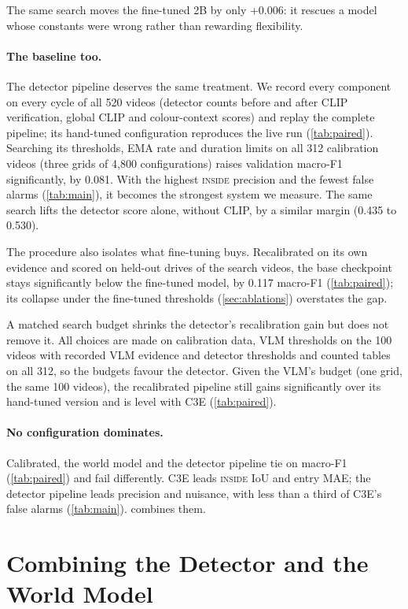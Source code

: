 \documentclass[conference]{IEEEtran}
\let\oldtextsc\textsc
\renewcommand{\textsc}[1]{\mbox{\oldtextsc{#1}}}
\begin{document}
The same search moves the fine-tuned 2B by only +0.006: it rescues a model whose constants were wrong rather than rewarding flexibility.

\paragraph{The baseline too.}  The detector pipeline deserves the same treatment.  We record every component on every cycle of all 520 videos (detector counts before and after CLIP verification, global CLIP and colour-context scores) and replay the complete pipeline; its hand-tuned configuration reproduces the live run (\cref{tab:paired}).  Searching its thresholds, EMA rate and duration limits on all 312 calibration videos (three grids of 4{,}800 configurations) raises validation macro-F1 significantly, by 0.081.  With the highest \textsc{inside} precision and the fewest false alarms (\cref{tab:main}), it becomes the strongest system we measure.  The same search lifts the detector score alone, without CLIP, by a similar margin (0.435 to 0.530).

The procedure also isolates what fine-tuning buys.  Recalibrated on its own evidence and scored on held-out drives of the search videos, the base checkpoint stays significantly below the fine-tuned model, by 0.117 macro-F1 (\cref{tab:paired}); its collapse under the fine-tuned thresholds (\cref{sec:ablations}) overstates the gap.

A matched search budget shrinks the detector's recalibration gain but does not remove it.  All choices are made on calibration data, VLM thresholds on the 100 videos with recorded VLM evidence and detector thresholds and counted tables on all 312, so the budgets favour the detector.  Given the VLM's budget (one grid, the same 100 videos), the recalibrated pipeline still gains significantly over its hand-tuned version and is level with C3E (\cref{tab:paired}).

\paragraph{No configuration dominates.}  Calibrated, the world model and the detector pipeline tie on macro-F1 (\cref{tab:paired}) and fail differently.  C3E leads \textsc{inside} IoU and entry MAE; the detector pipeline leads precision and nuisance, with less than a third of C3E's false alarms (\cref{tab:main}).   combines them.

\section{Combining the Detector and the World Model}
\label{sec:joint}
\end{document}
